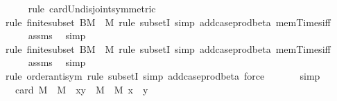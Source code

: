 \begin{isabellebody}
\ \ \ \ \isamarkupfalse%
\ {\isacharparenleft}{\kern0pt}rule\ card{\isacharunderscore}{\kern0pt}Un{\isacharunderscore}{\kern0pt}disjoint{\isacharbrackleft}{\kern0pt}symmetric{\isacharbrackright}{\kern0pt}{\isacharparenright}{\kern0pt}\isanewline
\ \ \ \ \isamarkupfalse%
\ {\isacharparenleft}{\kern0pt}rule\ finite{\isacharunderscore}{\kern0pt}subset{\isacharbrackleft}{\kern0pt}\ B{\isacharequal}{\kern0pt}{\isachardoublequoteopen}M\ {\isasymtimes}\ M{\isachardoublequoteclose}{\isacharbrackright}{\kern0pt}{\isacharcomma}{\kern0pt}\ rule\ subsetI{\isacharcomma}{\kern0pt}\ simp\ add{\isacharcolon}{\kern0pt}case{\isacharunderscore}{\kern0pt}prod{\isacharunderscore}{\kern0pt}beta\ mem{\isacharunderscore}{\kern0pt}Times{\isacharunderscore}{\kern0pt}iff{\isacharparenright}{\kern0pt}\isanewline
\ \ \ \ \isamarkupfalse%
\ assms\ \isamarkupfalse%
\ simp\isanewline
\ \ \ \ \isamarkupfalse%
\ {\isacharparenleft}{\kern0pt}rule\ finite{\isacharunderscore}{\kern0pt}subset{\isacharbrackleft}{\kern0pt}\ B{\isacharequal}{\kern0pt}{\isachardoublequoteopen}M\ {\isasymtimes}\ M{\isachardoublequoteclose}{\isacharbrackright}{\kern0pt}{\isacharcomma}{\kern0pt}\ rule\ subsetI{\isacharcomma}{\kern0pt}\ simp\ add{\isacharcolon}{\kern0pt}case{\isacharunderscore}{\kern0pt}prod{\isacharunderscore}{\kern0pt}beta\ mem{\isacharunderscore}{\kern0pt}Times{\isacharunderscore}{\kern0pt}iff{\isacharparenright}{\kern0pt}\isanewline
\ \ \ \ \isamarkupfalse%
\ assms\ \isamarkupfalse%
\ simp\isanewline
\ \ \ \ \isamarkupfalse%
\ {\isacharparenleft}{\kern0pt}rule\ order{\isacharunderscore}{\kern0pt}antisym{\isacharcomma}{\kern0pt}\ rule\ subsetI{\isacharcomma}{\kern0pt}\ simp\ add{\isacharcolon}{\kern0pt}case{\isacharunderscore}{\kern0pt}prod{\isacharunderscore}{\kern0pt}beta{\isacharcomma}{\kern0pt}\ force{\isacharparenright}{\kern0pt}\ \isanewline
\ \ \ \ \isamarkupfalse%
\ simp\isanewline
\ \ \isamarkupfalse%
\ \isamarkupfalse%
\ {\isachardoublequoteopen}{\isachardot}{\kern0pt}{\isachardot}{\kern0pt}{\isachardot}{\kern0pt}\ {\isacharequal}{\kern0pt}\ card\ {\isacharparenleft}{\kern0pt}{\isacharparenleft}{\kern0pt}M\ {\isasymtimes}\ M{\isacharparenright}{\kern0pt}\ {\isacharminus}{\kern0pt}\ {\isacharbraceleft}{\kern0pt}{\isacharparenleft}{\kern0pt}x{\isacharcomma}{\kern0pt}y{\isacharparenright}{\kern0pt}\ {\isasymin}\ M\ {\isasymtimes}\ M{\isachardot}{\kern0pt}\ x\ {\isacharequal}{\kern0pt}\ y{\isacharbraceright}{\kern0pt}{\isacharparenright}{\kern0pt}{\isachardoublequoteclose}\isanewline

\end{isabellebody}
